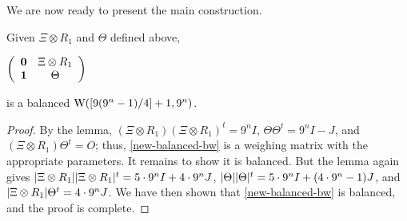\documentclass[../../../main]{subfiles}
\begin{document}
We are now ready to present the main construction.

\begin{thm}
 Given $\Xi \otimes R_1$ and $\Theta$ defined above,
 \begin{defenum}
  \item\label{new-balanced-bw} $
  \left(\begin{array}{cc}
   \mathbf{0} & \Xi \otimes R_1 \\ \mathbf{1} & \Theta
  \end{array}\right)
  $
 \end{defenum}
 is a balanced $\text{W}([9(9^n-1)/4]+1,9^n)$.
\end{thm}
 
 \begin{proof}
  By the lemma, $(\Xi \otimes R_1)(\Xi \otimes R_1)^t = 9^nI$, $\Theta\Theta^t = 9^nI-J$, and $(\Xi \otimes R_1)\Theta^t = O$; thus, \ref{new-balanced-bw} is a weighing matrix with the appropriate parameters. It remains to show it is balanced. But the lemma again gives $|\Xi \otimes R_1||\Xi \otimes R_1|^t = 5 \cdot 9^nI + 4 \cdot 9^nJ$, $|\Theta||\Theta|^t = 5 \cdot 9^nI + (4 \cdot 9^n - 1)J$, and $|\Xi \otimes R_1|\Theta^t = 4 \cdot 9^nJ$. We have then shown that \ref{new-balanced-bw} is balanced, and the proof is complete.
 \end{proof}

\biblio
\end{document}
